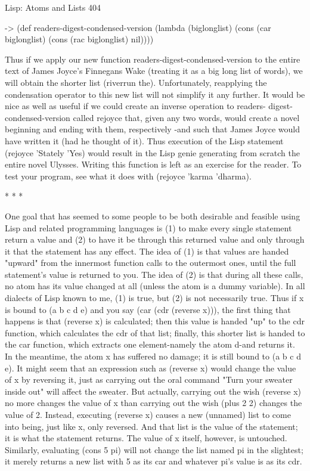 Lisp: Atoms and Lists                                                                  404

-> (def readers-digest-condensed-version
  (lambda (biglonglist)
   (cons (car biglonglist) (cons (rac biglonglist) nil))))

Thus if we apply our new function readers-digest-condensed-version to the entire
text of James Joyce's Finnegans Wake (treating it as a big long list of words), we will
obtain the shorter list (riverrun the). Unfortunately, reapplying the condensation
operator to this new list will not simplify it any further.
It would be nice as well as useful if we could create an inverse operation to readers-
digest-condensed-version called rejoyce that, given any two words, would create a
novel beginning and ending with them, respectively -and such that James Joyce would
have written it (had he thought of it). Thus execution of the Lisp statement (rejoyce
'Stately 'Yes) would result in the Lisp genie generating from scratch the entire novel
Ulysses. Writing this function is left as an exercise for the reader. To test your
program, see what it does with (rejoyce 'karma 'dharma).

                                       *   *   *

        One goal that has seemed to some people to be both desirable and feasible
using Lisp and related programming languages is (1) to make every single statement
return a value and (2) to have it be through this returned value and only through it that
the statement has any effect. The idea of (1) is that values are handed "upward" from
the innermost function calls to the outermost ones, until the full statement's value is
returned to you. The idea of (2) is that during all these calls, no atom has its value
changed at all (unless the atom is a dummy variable). In all dialects of Lisp known to
me, (1) is true, but (2) is not necessarily true.
        Thus if x is bound to (a b c d e) and you say (car (cdr (reverse x))), the first
thing that happens is that (reverse x) is calculated; then this value is handed "up" to
the cdr function, which calculates the cdr of that list; finally, this shorter list is
handed to the car function, which extracts one element-namely the atom d-and
returns it. In the meantime, the atom x has suffered no damage; it is still bound to (a b
c d e).
It might seem that an expression such as (reverse x) would change the value of x by
reversing it, just as carrying out the oral command "Turn your sweater inside out" will
affect the sweater. But actually, carrying out the wish (reverse x) no more changes
the value of x than carrying out the wish (plus 2 2) changes the value of 2. Instead,
executing (reverse x) causes a new (unnamed) list to come into being, just like x, only
reversed. And that list is the value of the statement; it is what the statement returns.
The value of x itself, however, is untouched. Similarly, evaluating (cons 5 pi) will not
change the list named pi in the slightest; it merely returns a new list with 5 as its car
and whatever pi's value is as its cdr.




